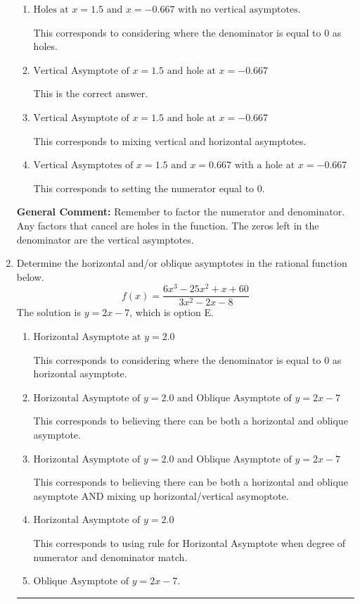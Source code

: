 \documentclass{extbook}[14pt]
\newcommand{\litem}[1]{\item #1

\rule{\textwidth}{0.4pt}}
\begin{document}
\begin{enumerate}
{\begin{enumerate}[label=\Alph*.]
This corresponds to not factoring out the hole.
\item \( \text{Holes at } x = 1.5 \text{ and } x = -0.667 \text{ with no vertical asymptotes.} \)

This corresponds to considering where the denominator is equal to 0 as holes.
\item \( \text{Vertical Asymptote of } x = 1.5 \text{ and hole at } x = -0.667 \)

This is the correct answer.
\item \( \text{Vertical Asymptote of } x = 1.5 \text{ and hole at } x = -0.667 \)

This corresponds to mixing vertical and horizontal asymptotes.
\item \( \text{Vertical Asymptotes of } x = 1.5 \text{ and } x = 0.667 \text{ with a hole at } x = -0.667 \)

This corresponds to setting the numerator equal to 0.
\end{enumerate}

\textbf{General Comment:} Remember to factor the numerator and denominator. Any factors that cancel are holes in the function. The zeros left in the denominator are the vertical asymptotes.
}
\litem{
Determine the horizontal and/or oblique asymptotes in the rational function below.
\[ f(x) = \frac{6x^{3} -25 x^{2} +x + 60}{3x^{2} -2 x -8} \]The solution is \( y = 2x -7 \), which is option E.\begin{enumerate}[label=\Alph*.]
\item \( \text{Horizontal Asymptote at } y = 2.0 \)

This corresponds to considering where the denominator is equal to 0 as horizontal asymptote.
\item \( \text{Horizontal Asymptote of } y = 2.0 \text{ and Oblique Asymptote of } y = 2x -7 \)

This corresponds to believing there can be both a horizontal and oblique asymptote.
\item \( \text{Horizontal Asymptote of } y = 2.0 \text{ and Oblique Asymptote of } y = 2x -7 \)

This corresponds to believing there can be both a horizontal and oblique asymptote AND mixing up horizontal/vertical asymoptote.
\item \( \text{Horizontal Asymptote of } y = 2.0  \)

This corresponds to using rule for Horizontal Asymptote when degree of numerator and denominator match.
\item \( \text{Oblique Asymptote of } y = 2x -7. \)


\end{enumerate}}
\end{enumerate}
\end{document}
